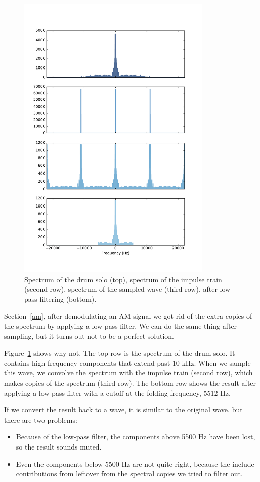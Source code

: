 \documentclass[12pt]{book}
\begin{document}
\begin{figure}
\centerline{\includegraphics[height=5.5in]{figs/sampling4.pdf}}
\caption{Spectrum of the drum solo (top), spectrum of the impulse
train (second row), spectrum of the sampled wave (third row),
after low-pass filtering (bottom).}
\label{fig.sampling4}
\end{figure}

Section~\ref{am}, after demodulating an AM signal we got rid of
the extra copies of the spectrum by applying a low-pass filter.
We can do the same thing after sampling, but it turns out
not to be a perfect solution.

Figure~\ref{fig.sampling4} shows why not.  The top row is the spectrum
of the drum solo.  It contains high frequency components that extend
past 10 kHz.  When we sample this wave, we convolve the spectrum
with the impulse train (second row), which makes copies of the spectrum
(third row).  The bottom row shows the result after applying a low-pass
filter with a cutoff at the folding frequency, 5512 Hz.

If we convert the result back to a wave, it is similar to the original
wave, but there are two problems:

\begin{itemize}

\item Because of the low-pass filter, the components above 5500 Hz
have been lost, so the result sounds muted.

\item Even the components below 5500 Hz are not quite right, because
the include contributions from leftover from the spectral copies we
tried to filter out.

\end{itemize}
\end{document}
